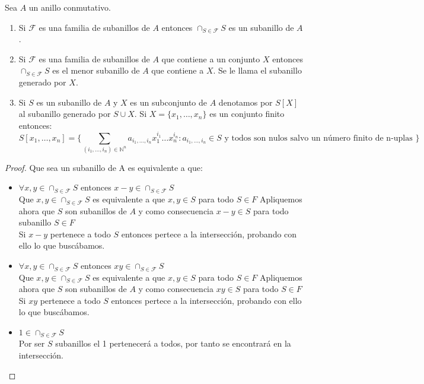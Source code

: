 \begin{proposition}
Sea $A$ un anillo conmutativo. 

\begin{enumerate}
\item Si $\mathcal{F}$ es una familia de subanillos de $A$ entonces $\cap_{S \in \mathcal{F}} S$ es un subanillo de $A$. 
\item Si $\mathcal{F}$ es una familia de subanillos de $A$ que contiene a un conjunto $X$ entonces $\cap_{S \in \mathcal{F}} S$ es el menor subanillo de $A$ que contiene a $X$. Se le llama el subanillo generado por $X$. 
\item Si $S$ es un subanillo de $A$ y $X$ es un subconjunto de $A$ denotamos por $S[X]$ al subanillo generado por $S \cup X$. Si $X = \{x_1,\ldots,x_n \}$ es un conjunto finito entonces: $$S[x_1,\ldots,x_n] = \{\sum_{(i_1,\ldots,i_n) \in \mathbb{N}^n} a_{i_1,\ldots,i_n} x_1^{i_1} \ldots x_n^{i_n}: a_{i_1,\ldots,i_n} \in S \text{ y todos son nulos salvo un número finito de n-uplas } \}$$
\end{enumerate}
\begin{proof}
\item Que sea un subanillo de A es equivalente a que:
  \begin{itemize}
  \item $ \forall x,y \in \cap_{S \in \mathcal{F}} S$ entonces $ x-y \in \cap_{S \in \mathcal{F}}S$ \\
      Que $ x,y \in \cap_{S \in \mathcal{F}} S $ es equivalente a que $x,y \in S $ para todo $S \in F$ Apliquemos ahora que $S$ son subanillos de $A$ y como consecuencia $x-y \in S $ para todo subanillo $ S \in F$ \\
       Si $x-y$ pertenece a todo $S$ entonces pertece a la intersección,  probando con ello lo que buscábamos.
       
    \item  $ \forall x,y \in \cap_{S \in \mathcal{F}} S$ entonces $ xy \in \cap_{S \in \mathcal{F}}S$ \\
     Que $ x,y \in \cap_{S \in \mathcal{F}} S $ es equivalente a que $x,y \in S $ para todo $S \in F$ Apliquemos ahora que $S$ son subanillos de $A$ y como consecuencia $xy \in S $ para todo $S \in F$ \\
       Si $xy$ pertenece a todo $S$ entonces pertece a la intersección,  probando con ello lo que buscábamos.
       
    \item $1 \in \cap_{S \in \mathcal{F}} S$  \\
    Por ser $S$ subanillos el 1 pertenecerá a todos, por tanto se encontrará en la intersección. 
    
    \end{itemize}
\end{proof}

\end{proposition}

